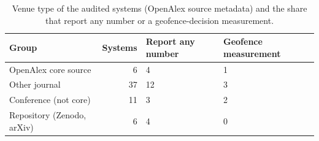 \begin{table}[tbp]\centering\small
\caption{Venue type of the audited systems (OpenAlex source metadata) and the share that report any number or a geofence-decision measurement.}\label{tab:venue}
\begin{tabular}{@{}lrL{2.2cm}L{2.6cm}@{}}\toprule Group & Systems & Report any number & Geofence measurement \\ \midrule
OpenAlex core source & 6 & 4 & 1 \\
Other journal & 37 & 12 & 3 \\
Conference (not core) & 11 & 3 & 2 \\
Repository (Zenodo, arXiv) & 6 & 4 & 0 \\
\bottomrule\end{tabular}\end{table}
